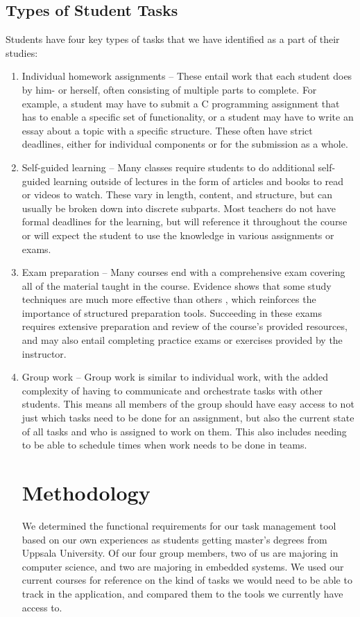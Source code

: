 \documentclass[11pt,oneside]{article}
\begin{document}
\subsection{Types of Student Tasks}
Students have four key types of tasks that we have identified as a part of their studies: 

\begin{enumerate}
\item Individual homework assignments – These entail work that each student does by him- or herself, often consisting of multiple parts to complete. For example, a student may have to submit a C programming assignment that has to enable a specific set of functionality, or a student may have to write an essay about a topic with a specific structure. These often have strict deadlines, either for individual components or for the submission as a whole.
\item Self-guided learning – Many classes require students to do additional self-guided learning outside of lectures in the form of articles and books to read or videos to watch. These vary in length, content, and structure, but can usually be broken down into discrete subparts. Most teachers do not have formal deadlines for the learning, but will reference it throughout the course or will expect the student to use the knowledge in various assignments or exams.
\item Exam preparation – Many courses end with a comprehensive exam covering all of the material taught in the course. Evidence shows that some study techniques are much more effective than others \citep{dunlosky2013improving}, which reinforces the importance of structured preparation tools. Succeeding in these exams requires extensive preparation and review of the course’s provided resources, and may also entail completing practice exams or exercises provided by the instructor.
\item Group work – Group work is similar to individual work, with the added complexity of having to communicate and orchestrate tasks with other students. This means all members of the group should have easy access to not just which tasks need to be done for an assignment, but also the current state of all tasks and who is assigned to work on them. This also includes needing to be able to schedule times when work needs to be done in teams.


\section{Methodology}
We determined the functional requirements for our task management tool based on our own experiences as students getting master’s degrees from Uppsala University. Of our four group members, two of us are majoring in computer science, and two are majoring in embedded systems. We used our current courses for reference on the kind of tasks we would need to be able to track in the application, and compared them to the tools we currently have access to. 


\end{enumerate}
\end{document}
